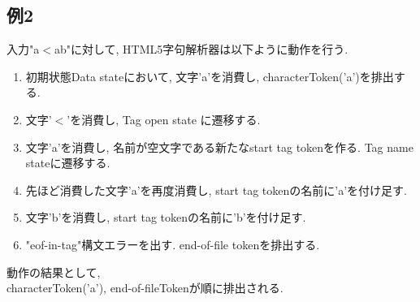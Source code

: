 \documentclass[uplatex,a4j]{jsreport}
\begin{document}
\subsection{例2}
入力"a$<$ab"に対して, HTML5字句解析器は以下ように動作を行う.\\
\begin{enumerate}
    \item 初期状態Data stateにおいて, 文字'a'を消費し, characterToken('a')を排出する.
    \item 文字'$<$'を消費し, Tag open state に遷移する.
    \item 文字'a'を消費し, 名前が空文字である新たなstart tag tokenを作る. Tag name stateに遷移する.
    \item 先ほど消費した文字'a'を再度消費し, start tag tokenの名前に'a'を付け足す.
    \item 文字'b'を消費し, start tag tokenの名前に'b'を付け足す.
    \item "eof-in-tag"構文エラーを出す. end-of-file tokenを排出する.
\end{enumerate}
動作の結果として,\\
characterToken('a'), end-of-fileTokenが順に排出される.
\end{document}
